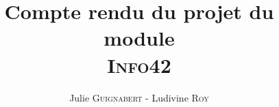 \documentclass[a4paper,10pt]{report}
\title{Compte rendu du projet du module \\\textsc{Info42}}
\author{Julie \textsc{Guignabert} - Ludivine \textsc{Roy}}
\begin{document}
  \maketitle
  \pagestyle{fancy}
  \renewcommand{\headheight}{13pt}
  \renewcommand{\headrulewidth}{1pt}
  \renewcommand{\footrulewidth}{1pt}
  \renewcommand{\headsep}{10pt}
  \rhead{\thepage}
  \setcounter{tocdepth}{0}
  \renewcommand{\contentsname}{Sommaire}
  \tableofcontents

  
  
  
  
  
  
  
  
\end{document}
